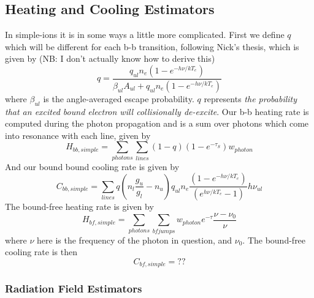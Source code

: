 \subsection{Heating and Cooling Estimators}
In simple-ions it is in some ways a little more complicated. 
First we define $q$ which will be different for each b-b transition, 
following Nick's thesis, which is given by 
(NB: I don't actually know how to derive this)
\begin{equation}
q = \frac{q_{ul} n_e (1 - e^{-h\nu/kT_e})}{\beta_{ul} A_{ul} + q_{ul} n_e (1 - e^{-h\nu/kT_e})}
\end{equation}
where $\beta_{ul}$ is the angle-averaged escape probability. 
$q$ represents {\em the probability that an excited bound electron
will collisionally de-excite}.
Our b-b heating rate is computed during the photon propagation and is a sum
over photons which come into resonance with each line, given by 
\begin{equation}
H_{bb,simple} = \sum_{photons} \sum_{lines} (1 - q) (1 - e^{-\tau_S}) w_{photon}
\end{equation}
And our bound bound cooling rate is given by 
\begin{equation}
C_{bb,simple} = \sum_{lines} q \left(n_l\frac{g_u}{g_l} - n_u\right) q_{ul} n_e 
\frac{(1 - e^{-h\nu/kT_e})}{(e^{h\nu/kT_e} - 1)}  h \nu_{ul}
\end{equation}
\noindent
The bound-free heating rate is given by
\begin{equation}
H_{bf,simple} = \sum_{photons} \sum_{bfjumps} w_{photon} e^{-\tau} \frac{\nu - \nu_{0}}{\nu}
\end{equation}
where $\nu$ here is the frequency of the photon in question, and $\nu_{0}$.
The bound-free cooling rate is then
\begin{equation}
C_{bf,simple} = ??
\end{equation}

\subsubsection{Radiation Field Estimators}

